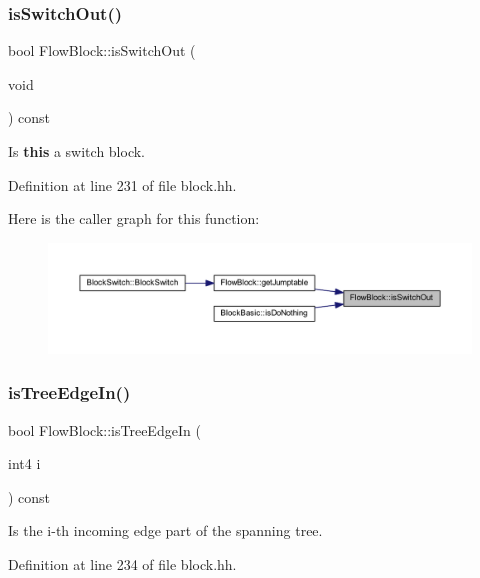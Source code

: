 \subsubsection{\texorpdfstring{isSwitchOut()}{isSwitchOut()}}
{\footnotesize\ttfamily bool Flow\+Block\+::is\+Switch\+Out (\begin{DoxyParamCaption}\item[{void}]{ }\end{DoxyParamCaption}) const\hspace{0.3cm}{\ttfamily [inline]}}



Is {\bfseries{this}} a switch block. 



Definition at line 231 of file block.\+hh.

Here is the caller graph for this function\+:
\nopagebreak
\begin{figure}[H]
\begin{center}
\leavevmode
\includegraphics[width=350pt]{class_flow_block_ab80d8989ba2b6e2046003367e478c951_icgraph}
\end{center}
\end{figure}
\mbox{\label{class_flow_block_af06b13621f990b9e0d239cdc7f696c6c}} 
\subsubsection{\texorpdfstring{isTreeEdgeIn()}{isTreeEdgeIn()}}
{\footnotesize\ttfamily bool Flow\+Block\+::is\+Tree\+Edge\+In (\begin{DoxyParamCaption}\item[{int4}]{i }\end{DoxyParamCaption}) const\hspace{0.3cm}{\ttfamily [inline]}}



Is the i-\/th incoming edge part of the spanning tree. 



Definition at line 234 of file block.\+hh.

